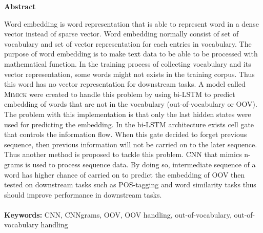 \documentclass[a4paper,12pt]{report}
\newcommand{\linespacing}{1.5}
\renewcommand{\baselinestretch}{\linespacing}
\begin{document}





\newpage
{}
\tableofcontents

\newpage
\pagebreak
\hspace{0pt}
\vfill
\begin{center}
	\textbf{Abstract}
\end{center}
\par Word embedding is word representation that is able to represent
word in a dense vector instead of sparse vector. Word embedding
normally consist of set of vocabulary and set of vector representation
for each entries in vocabulary. The purpose of word embedding is to
make text data to be able to be processed with mathematical function.
In the training process of collecting vocabulary and its vector
representation, some words might not exists in the training corpus.
Thus this word has no vector representation for downstream tasks. A
model called \textsc{Mimick} were created to handle this problem by
using bi-LSTM to predict embedding of words that are not in the
vocabulary (out-of-vocabulary or OOV). The problem with this
implementation is that only the last hidden states were used for
predicting the embedding. In the bi-LSTM architecture exists cell gate
that controls the information flow. When this gate decided to forget
previous sequence, then previous information will not be carried on to
the later sequence. Thus another method is proposed to tackle this
problem. CNN that mimics n-grams is used to process sequence data. By
doing so, intermediate sequence of a word has higher chance of carried
on to predict the embedding of OOV then tested on downstream tasks
such as POS-tagging and word similarity tasks thus should improve
performance in downstream tasks.
\\~\\
\textbf{Keywords:} CNN, CNNgrams, OOV, OOV handling,
out-of-vocabulary, out-of-vocabulary handling
\vfill
\hspace{0pt}
\pagebreak
\end{document}
